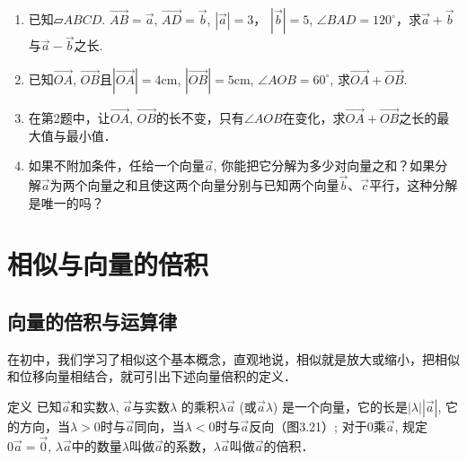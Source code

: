 \begin{enumerate}
    \item 已知$\parallelogram{ABCD}$. $\Vec{AB}=\vec{a}$, $\Vec{AD}=\vec{b}$, $|\vec{a}|=3$，
$|\vec{b}|=5$, $\angle BAD=120^{\circ}$，求$\vec{a}+\vec{b}$与$\vec{a}-\vec{b}$之长.
\item 已知$\Vec{OA}$, $\Vec{OB}$且$|\Vec{OA}|=4$cm, $|\Vec{OB}|=5$cm, $\angle AOB=60^{\circ}$, 求$\Vec{OA}+\Vec{OB}$.
\item 在第2题中，让$\Vec{OA}$, $\Vec{OB}$的长不变，只有$\angle AOB$在变化，求$\Vec{OA}+\Vec{OB}$之长的最大值与最小值．

\item 如果不附加条件，任给一个向量$\vec{a}$, 你能把它分解为多少对向量之和？如果分解$\vec{a}$为两个向量之和且使这两个向量分别与已知两个向量$\vec{b}$、$\vec{c}$平行，这种分解是唯一的吗？
\end{enumerate}

\section{相似与向量的倍积}
\subsection{向量的倍积与运算律}

在初中，我们学习了相似这个基本概念，直观地说，相似就是放大或缩小，把相似和位移向量相结合，就可引出下述向量倍积的定义．

\begin{blk}
    {定义} 已知$\vec{a}$和实数$\lambda$, $\vec{a}$与实数$\lambda$ 的乘积$\lambda \vec{a}$ (或$\vec{a}\lambda $) 是一个向量，它的长是$|\lambda| \left|\vec{a}\right|$, 它的方向，当$\lambda >0$时与$\vec{a}$同向，当$\lambda <0$时与$\vec{a}$反向（图3.21）; 对于0乘$\vec{a}$, 规定$0\vec{a}=\vec{0}$, $\lambda \vec{a}$中的数量$\lambda$叫做$\vec{a}$的系数，$\lambda\vec{a}$叫做$\vec{a}$的倍积．
\end{blk}

\begin{figure}[htp]
    \centering
{}
    \caption{}
\end{figure}

